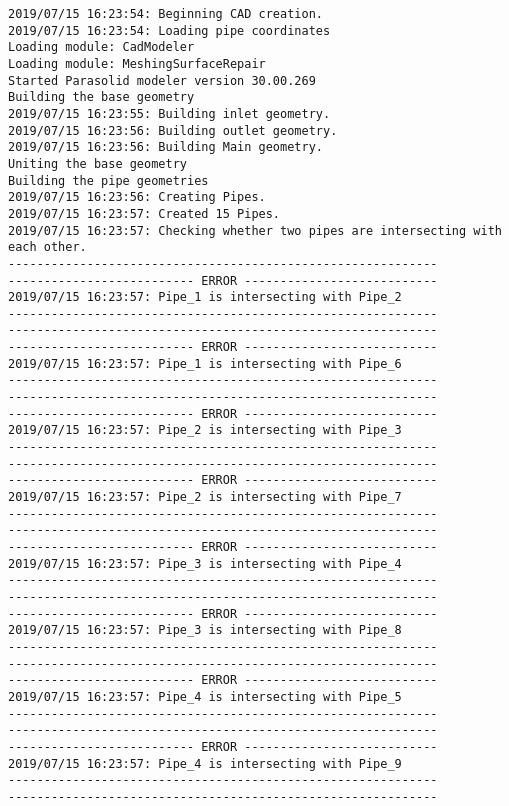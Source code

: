 \documentclass{article}
\begin{document}
{\tiny 
\begin{verbatim}
2019/07/15 16:23:54: Beginning CAD creation.
2019/07/15 16:23:54: Loading pipe coordinates
Loading module: CadModeler
Loading module: MeshingSurfaceRepair
Started Parasolid modeler version 30.00.269
Building the base geometry
2019/07/15 16:23:55: Building inlet geometry.
2019/07/15 16:23:56: Building outlet geometry.
2019/07/15 16:23:56: Building Main geometry.
Uniting the base geometry
Building the pipe geometries
2019/07/15 16:23:56: Creating Pipes.
2019/07/15 16:23:57: Created 15 Pipes.
2019/07/15 16:23:57: Checking whether two pipes are intersecting with each other.
------------------------------------------------------------
-------------------------- ERROR ---------------------------
2019/07/15 16:23:57: Pipe_1 is intersecting with Pipe_2
------------------------------------------------------------
------------------------------------------------------------
-------------------------- ERROR ---------------------------
2019/07/15 16:23:57: Pipe_1 is intersecting with Pipe_6
------------------------------------------------------------
------------------------------------------------------------
-------------------------- ERROR ---------------------------
2019/07/15 16:23:57: Pipe_2 is intersecting with Pipe_3
------------------------------------------------------------
------------------------------------------------------------
-------------------------- ERROR ---------------------------
2019/07/15 16:23:57: Pipe_2 is intersecting with Pipe_7
------------------------------------------------------------
------------------------------------------------------------
-------------------------- ERROR ---------------------------
2019/07/15 16:23:57: Pipe_3 is intersecting with Pipe_4
------------------------------------------------------------
------------------------------------------------------------
-------------------------- ERROR ---------------------------
2019/07/15 16:23:57: Pipe_3 is intersecting with Pipe_8
------------------------------------------------------------
------------------------------------------------------------
-------------------------- ERROR ---------------------------
2019/07/15 16:23:57: Pipe_4 is intersecting with Pipe_5
------------------------------------------------------------
------------------------------------------------------------
-------------------------- ERROR ---------------------------
2019/07/15 16:23:57: Pipe_4 is intersecting with Pipe_9
------------------------------------------------------------
------------------------------------------------------------

\end{verbatim}}
\end{document}
